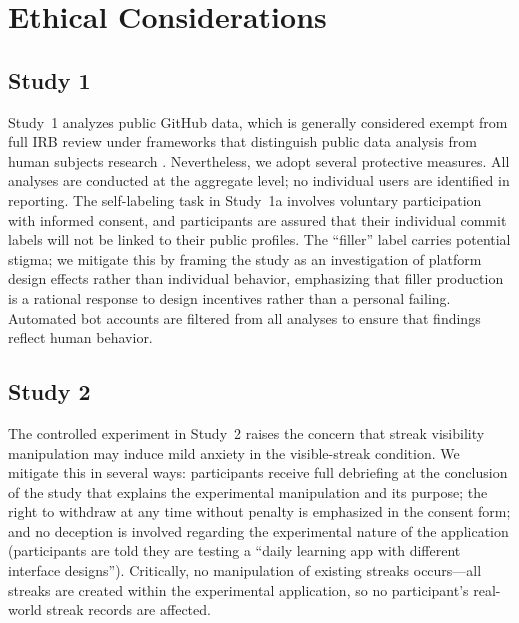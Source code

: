 \documentclass[12pt]{article}
\begin{document}
\section{Ethical Considerations}
\label{sec:ethics}

\subsection{Study 1}
\label{sec:ethics-study1}

Study~1 analyzes public GitHub data, which is generally considered exempt from full IRB review under frameworks that distinguish public data analysis from human subjects research \citep{Bruckman2002, Zimmer2010}. Nevertheless, we adopt several protective measures. All analyses are conducted at the aggregate level; no individual users are identified in reporting. The self-labeling task in Study~1a involves voluntary participation with informed consent, and participants are assured that their individual commit labels will not be linked to their public profiles. The ``filler'' label carries potential stigma; we mitigate this by framing the study as an investigation of platform design effects rather than individual behavior, emphasizing that filler production is a rational response to design incentives rather than a personal failing. Automated bot accounts are filtered from all analyses to ensure that findings reflect human behavior.

\subsection{Study 2}
\label{sec:ethics-study2}

The controlled experiment in Study~2 raises the concern that streak visibility manipulation may induce mild anxiety in the visible-streak condition. We mitigate this in several ways: participants receive full debriefing at the conclusion of the study that explains the experimental manipulation and its purpose; the right to withdraw at any time without penalty is emphasized in the consent form; and no deception is involved regarding the experimental nature of the application (participants are told they are testing a ``daily learning app with different interface designs''). Critically, no manipulation of existing streaks occurs---all streaks are created within the experimental application, so no participant's real-world streak records are affected.
\end{document}
